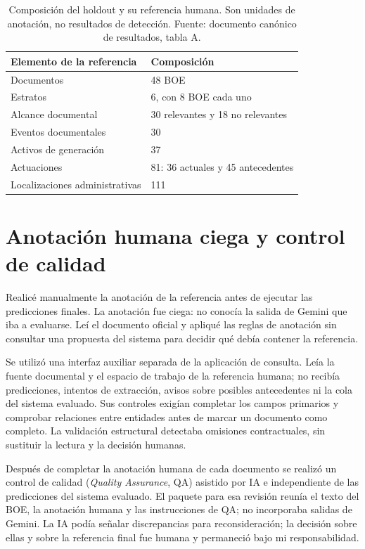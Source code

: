 \begin{table}[htbp]
\centering
\small
\renewcommand{\arraystretch}{1.2}
\begin{tabular}{L{7.3cm} L{4.8cm}}
\hline
Elemento de la referencia & Composición \\
\hline
Documentos & 48 BOE \\
Estratos & 6, con 8 BOE cada uno \\
Alcance documental & 30 relevantes y 18 no relevantes \\
Eventos documentales & 30 \\
Activos de generación & 37 \\
Actuaciones & 81: 36 actuales y 45 antecedentes \\
Localizaciones administrativas & 111 \\
\hline
\end{tabular}
\caption[Composición de la referencia V2]{Composición del holdout y su
referencia humana. Son unidades de anotación, no resultados de detección.
Fuente: documento canónico de resultados, tabla A.}
\label{tab:holdout-v2}
\end{table}

\section{Anotación humana ciega y control de calidad}
Realicé manualmente la anotación de la referencia antes de ejecutar las
predicciones finales. La anotación fue ciega: no conocía la salida de Gemini
que iba a evaluarse. Leí el documento oficial y apliqué las reglas de
anotación sin consultar una propuesta del sistema para decidir qué debía
contener la referencia.

Se utilizó una interfaz auxiliar separada de la aplicación de consulta.
Leía la fuente documental y el espacio de trabajo de la referencia humana;
no recibía predicciones, intentos de extracción, avisos sobre posibles
antecedentes ni la cola del sistema evaluado. Sus controles exigían completar los campos primarios y
comprobar relaciones entre entidades antes de marcar un documento como
completo. La validación estructural detectaba omisiones contractuales,
sin sustituir la lectura y la decisión humanas.

Después de completar la anotación humana de cada documento se realizó un
control de calidad (\textit{Quality Assurance}, QA) asistido por IA e
independiente de las
predicciones del sistema evaluado. El paquete para esa revisión reunía el
texto del BOE, la anotación humana y las instrucciones de QA; no incorporaba
salidas de Gemini. La IA podía señalar discrepancias para reconsideración;
la decisión sobre ellas y sobre la referencia final fue humana y permaneció
bajo mi responsabilidad.


